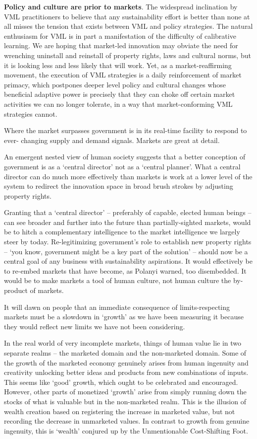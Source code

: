 \documentclass[
]{book}
\begin{document}
\textbf{Policy and culture are prior to markets}.
The widespread inclination by VML practitioners to believe that any sustainability effort is better
than none at all misses the tension that exists between VML and policy strategies.
The natural enthusiasm for VML is in part a manifestation of the difficulty of calibrative learning. We
are hoping that market-led innovation may obviate the need for wrenching uninstall and reinstall of
property rights, laws and cultural norms, but it is looking less and less likely that will work. Yet, as a
market-reaffirming movement, the execution of VML strategies is a daily reinforcement of market
primacy, which postpones deeper level policy and cultural changes whose beneficial adaptive power
is precisely that they can choke off certain market activities we can no longer tolerate, in a way that
market-conforming VML strategies cannot.

Where the market surpasses government is in its real-time facility to respond to ever-
changing supply and demand signals. Markets are great at detail.

An emergent nested view of human society suggests that a better conception of
government is as a `central director' not as a `central planner'.
What a central director can do much more effectively than markets is work at a lower level of the
system to redirect the innovation space in broad brush strokes by adjusting property rights.

Granting that a `central director' -- preferably of capable, elected human beings -- can see broader and
further into the future than partially-sighted markets, would be to hitch a complementary
intelligence to the market intelligence we largely steer by today.
Re-legitimizing government's role to establish new property rights -- `you know, government might be
a key part of the solution' -- should now be a central goal of any business with sustainability
aspirations. It would effectively be to re-embed markets that have become, as Polanyi warned, too
disembedded. It would be to make markets a tool of human culture, not human culture the by-
product of markets.

It will dawn on people that an immediate consequence of limits-respecting markets must be a
slowdown in `growth' as we have been measuring it because they would reflect new limits we have
not been considering.

In the real world of very incomplete markets, things of human value lie in two separate realms -- the
marketed domain and the non-marketed domain. Some of the growth of the marketed economy
genuinely arises from human ingenuity and creativity unlocking better ideas and products from new
combinations of inputs. This seems like `good' growth, which ought to be celebrated and encouraged.
However, other parts of monetized `growth' arise from simply running down the stocks of what is
valuable but in the non-marketed realm. This is the illusion of wealth creation based on registering
the increase in marketed value, but not recording the decrease in unmarketed values. In contrast to
growth from genuine ingenuity, this is `wealth' conjured up by the Unmentionable Cost-Shifting
Foot.
\end{document}
